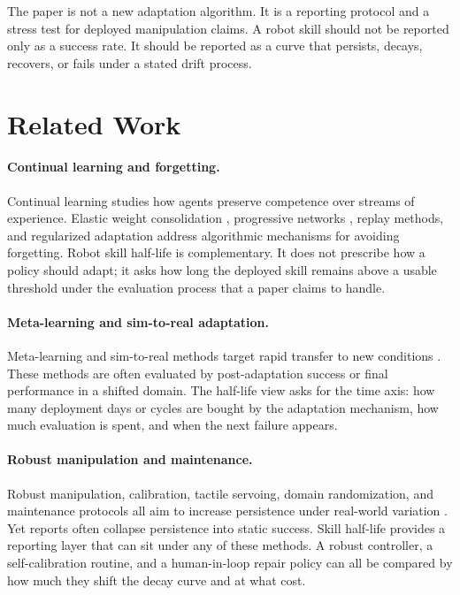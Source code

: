 \documentclass{article}
\begin{document}
The paper is not a new adaptation algorithm. It is a reporting protocol and a
stress test for deployed manipulation claims. A robot skill should not be
reported only as a success rate. It should be reported as a curve that persists,
decays, recovers, or fails under a stated drift process.

\section{Related Work}

\paragraph{Continual learning and forgetting.}
Continual learning studies how agents preserve competence over streams of
experience. Elastic weight consolidation \citep{kirkpatrick2017ewc},
progressive networks \citep{rusu2016progressive}, replay methods, and
regularized adaptation address algorithmic mechanisms for avoiding forgetting.
Robot skill half-life is complementary. It does not prescribe how a policy
should adapt; it asks how long the deployed skill remains above a usable
threshold under the evaluation process that a paper claims to handle.

\paragraph{Meta-learning and sim-to-real adaptation.}
Meta-learning and sim-to-real methods target rapid transfer to new conditions
\citep{finn2017maml,duan2016rl2,peng2018simtoreal,chebotar2019closing}. These
methods are often evaluated by post-adaptation success or final performance in a
shifted domain. The half-life view asks for the time axis: how many deployment
days or cycles are bought by the adaptation mechanism, how much evaluation is
spent, and when the next failure appears.

\paragraph{Robust manipulation and maintenance.}
Robust manipulation, calibration, tactile servoing, domain randomization, and
maintenance protocols all aim to increase persistence under real-world
variation \citep{levine2016endtoend,kalashnikov2018qtopt,andrychowicz2020learning,openai2019solving}. Yet reports often collapse persistence into static
success. Skill half-life provides a reporting layer that can sit under any of
these methods. A robust controller, a self-calibration routine, and a
human-in-loop repair policy can all be compared by how much they shift the
decay curve and at what cost.
\end{document}
